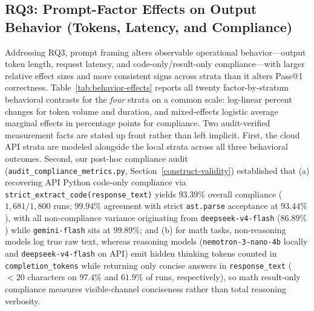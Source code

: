 \documentclass[a4paper,fleqn]{cas-sc}
\begin{document}
\subsection{RQ3: Prompt-Factor Effects on Output Behavior (Tokens, Latency, and Compliance)}\label{output-behavior-tokens-duration-and-result-only-compliance}

Addressing RQ3, prompt framing alters observable operational behavior—output token length, request latency, and code-only/result-only compliance—with larger relative effect sizes and more consistent signs across strata than it alters Pass@1 correctness. Table~\ref{tab:behavior-effects} reports all twenty factor-by-stratum behavioral contrasts for the \emph{four} strata on a common scale: log-linear percent changes for token volume and duration, and mixed-effects logistic average marginal effects in percentage points for compliance. Two audit-verified measurement facts are stated up front rather than left implicit. First, the cloud API strata are modeled alongside the local strata across all three behavioral outcomes. Second, our post-hoc compliance audit (\texttt{audit\_compliance\_metrics.py}, Section~\ref{construct-validity}) established that (a) recovering API Python code-only compliance via \texttt{strict\_extract\_code(response\_text)} yields $93.39\%$ overall compliance ($1{,}681 / 1{,}800$ runs; $99.94\%$ agreement with strict \texttt{ast.parse} acceptance at $93.44\%$), with all non-compliance variance originating from \texttt{deepseek-v4-flash} ($86.89\%$) while \texttt{gemini-flash} sits at $99.89\%$; and (b) for math tasks, non-reasoning models log true raw text, whereas reasoning models (\texttt{nemotron-3-nano-4b} locally and \texttt{deepseek-v4-flash} on API) emit hidden thinking tokens counted in \texttt{completion\_tokens} while returning only concise answers in \texttt{response\_text} ($<20$ characters on $97.4\%$ and $61.9\%$ of runs, respectively), so math result-only compliance measures visible-channel conciseness rather than total reasoning verbosity.
\end{document}
